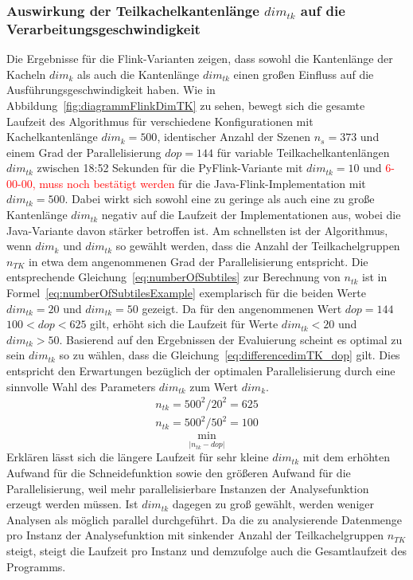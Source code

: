 \subsubsection{Auswirkung der Teilkachelkantenlänge $dim_{tk}$ auf die Verarbeitungsgeschwindigkeit}
Die Ergebnisse für die Flink-Varianten zeigen, dass sowohl die Kantenlänge der Kacheln $dim_{k}$ als auch die Kantenlänge $dim_{tk}$ einen großen Einfluss auf die Ausführungsgeschwindigkeit haben. Wie in Abbildung~\ref{fig:diagrammFlinkDimTK} zu sehen, bewegt sich die gesamte Laufzeit des Algorithmus für verschiedene Konfigurationen mit Kachelkantenlänge $dim_k = 500$, identischer Anzahl der Szenen $n_s = 373$ und einem Grad der Parallelisierung $dop = 144$ für variable Teilkachelkantenlängen $dim_{tk}$ zwischen 18:52 Sekunden für die PyFlink-Variante mit $dim_{tk} = 10$ und \textcolor{red}{6-00-00, muss noch bestätigt werden} für die Java-Flink-Implementation mit $dim_{tk} = 500$. Dabei wirkt sich sowohl eine zu geringe als auch eine zu große Kantenlänge $dim_{tk}$ negativ auf die Laufzeit der Implementationen aus, wobei die Java-Variante davon stärker betroffen ist. Am schnellsten ist der Algorithmus, wenn $dim_k$ und $dim_{tk}$ so gewählt werden, dass die Anzahl der Teilkachelgruppen $n_{TK}$ in etwa dem angenommenen Grad der Parallelisierung entspricht. Die entsprechende Gleichung~\ref{eq:numberOfSubtiles} zur Berechnung von $n_{tk}$ ist in Formel~\ref{eq:numberOfSubtilesExample} exemplarisch für die beiden Werte $dim_{tk} = 20$ und $dim_{tk} = 50$ gezeigt. Da für den angenommenen Wert $dop = 144$ $100 < dop < 625$ gilt, erhöht sich die Laufzeit für Werte $dim_{tk} < 20$ und $dim_{tk} > 50$. Basierend auf den Ergebnissen der Evaluierung scheint es optimal zu sein $dim_{tk}$ so zu wählen, dass die Gleichung~\ref{eq:differencedimTK_dop} gilt. Dies entspricht den Erwartungen bezüglich der optimalen Parallelisierung durch eine sinnvolle Wahl des Parameters $dim_{tk}$ zum Wert $dim_k$.
%
\begin{equation}  \label{eq:numberOfSubtilesExample}
	\begin{aligned}
  		n_{tk} = {500^2} / {20^2} = 625\\
  		n_{tk} = {500^2} / {50^2} = 100
	\end{aligned}
\end{equation}
%
\begin{equation}  \label{eq:differencedimTK_dop}
  	 \min_{|n_{tk} - dop|}
\end{equation}
%
Erklären lässt sich die längere Laufzeit für sehr kleine $dim_{tk}$ mit dem erhöhten Aufwand für die Schneidefunktion sowie den größeren Aufwand für die Parallelisierung, weil mehr parallelisierbare Instanzen der Analysefunktion erzeugt werden müssen. Ist $dim_{tk}$ dagegen zu groß gewählt, werden weniger Analysen als möglich parallel durchgeführt. Da die zu analysierende Datenmenge pro Instanz der Analysefunktion mit sinkender Anzahl der Teilkachelgruppen $n_{TK}$ steigt, steigt die Laufzeit pro Instanz und demzufolge auch die Gesamtlaufzeit des Programms. 

